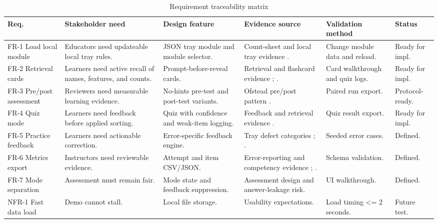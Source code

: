 \documentclass[10pt,a4paper]{article}
\begin{document}
\begin{table}[H]
\centering
\caption{Requirement traceability matrix}
\label{tab:requirement-traceability-matrix}
\small\renewcommand{\arraystretch}{1.15}\setlength{\tabcolsep}{3pt}
\begin{tabularx}{\textwidth}{|>{\raggedright\arraybackslash}p{1.5cm}|>{\raggedright\arraybackslash}X|>{\raggedright\arraybackslash}X|>{\raggedright\arraybackslash}p{2.5cm}|>{\raggedright\arraybackslash}p{2.3cm}|>{\raggedright\arraybackslash}p{1.7cm}|}
\hline
Req. & Stakeholder need & Design feature & Evidence source & Validation method & Status \\
\hline
FR-1 Load local module & Educators need updateable local tray rules. & JSON tray module and module selector. & Count-sheet and local tray evidence \cite{nadeau-2024}. & Change module data and reload. & Ready for impl. \\
\hline
FR-2 Retrieval cards & Learners need active recall of names, features, and counts. & Prompt-before-reveal cards. & Retrieval and flashcard evidence \cite{roediger-and-karpicke-2006}; \cite{barrison-et-al-2025}. & Card walkthrough and quiz logs. & Ready for impl. \\
\hline
FR-3 Pre/post assessment & Reviewers need measurable learning evidence. & No-hints pre-test and post-test variants. & Ofstead pre/post pattern \cite{ofstead-et-al-2023}. & Paired run export. & Protocol-ready. \\
\hline
FR-4 Quiz mode & Learners need feedback before applied sorting. & Quiz with confidence and weak-item logging. & Feedback and retrieval evidence \cite{hattie-and-timperley-2007}. & Quiz result export. & Ready for impl. \\
\hline
FR-5 Practice feedback & Learners need actionable correction. & Error-specific feedback engine. & Tray defect categories \cite{alfred-et-al-2021}; \cite{nichol-et-al-2024}. & Seeded error cases. & Defined. \\
\hline
FR-6 Metrics export & Instructors need reviewable evidence. & Attempt and item CSV/JSON. & Error-reporting and competency evidence \cite{nichol-et-al-2024}; \cite{ofstead-et-al-2023}. & Schema validation. & Defined. \\
\hline
FR-7 Mode separation & Assessment must remain fair. & Mode state and feedback suppression. & Assessment design and answer-leakage risk. & UI walkthrough. & Defined. \\
\hline
NFR-1 Fast data load & Demo cannot stall. & Local file storage. & Usability expectations. & Load timing <= 2 seconds. & Future test. \\

\end{tabularx}
\end{table}
\end{document}
